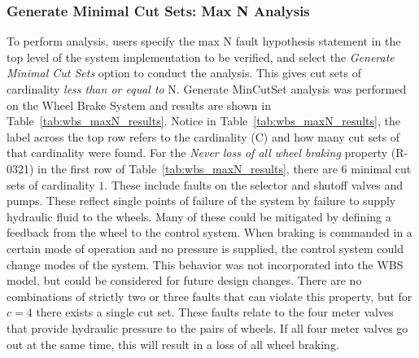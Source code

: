 \subsubsection{Generate Minimal Cut Sets: Max N Analysis}
\label{sec:maxN_generate}

To perform analysis, users specify the max N fault hypothesis statement in the top level of the system implementation to be verified, and select the \textit{Generate Minimal Cut Sets} option to conduct the analysis. This gives cut sets of cardinality \textit{less than or equal to} N. Generate MinCutSet analysis was performed on the Wheel Brake System and results are shown in Table~\ref{tab:wbs_maxN_results}. Notice in Table~\ref{tab:wbs_maxN_results}, the label across the top row refers to the cardinality (C) and how many cut sets of that cardinality were found. %
For the \textit{Never loss of all wheel braking} property (R-0321) in the first row of Table~\ref{tab:wbs_maxN_results}, there are $6$ minimal cut sets of cardinality $1$. These include faults on the selector and shutoff valves and pumps. These reflect single points of failure of the system by failure to supply hydraulic fluid to the wheels. Many of these could be mitigated by defining a feedback from the wheel to the control system. When braking is commanded in a certain mode of operation and no pressure is supplied, the control system could change modes of the system. This behavior was not incorporated into the WBS model, but could be considered for future design changes. There are no combinations of strictly two or three faults that can violate this property, but for $c = 4$ there exists a single cut set. These faults relate to the four meter valves that provide hydraulic pressure to the pairs of wheels. If all four meter valves go out at the same time, this will result in a loss of all wheel braking. 

